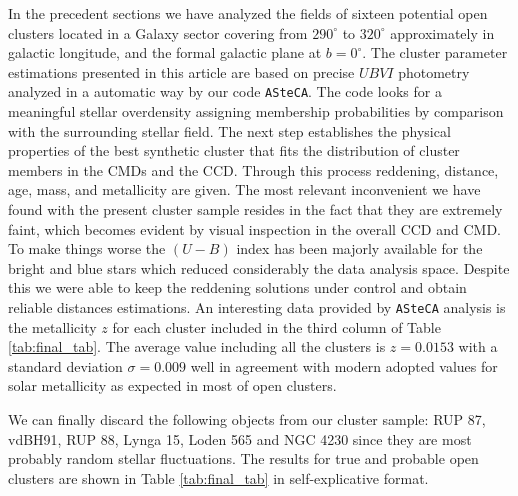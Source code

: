 \documentclass[draft]{aa}
\begin{document}
In the precedent sections we have analyzed the fields of sixteen potential
open clusters located in a Galaxy sector covering from $290^\circ$ to
$320^\circ$ approximately in galactic longitude, and the formal
galactic plane at $b=0^\circ$.
The cluster parameter estimations presented in this article are based on
precise $UBVI$ photometry analyzed in a automatic way by
our code \texttt{ASteCA}. The code looks for a meaningful stellar overdensity
assigning membership probabilities by comparison with the surrounding stellar
field.
The next step establishes the physical properties of the best synthetic cluster
that fits the distribution of cluster members in the CMDs and the CCD.
Through this process reddening, distance, age, mass, and metallicity are
given.
The most relevant inconvenient we have found with the present cluster
sample resides in the fact that they are extremely faint, which becomes evident
by visual inspection in the overall CCD and CMD.
To make things worse the $(U-B)$ index has been majorly available for
the bright and blue stars which reduced considerably the data analysis space.
Despite this we were able to keep the reddening solutions under control and
obtain reliable distances estimations.
An interesting data provided by \texttt{ASteCA} analysis is the
metallicity $z$ for each cluster included in the third column of Table 
\ref{tab:final_tab}. The average value including all the clusters is $z=0.0153$
with a standard deviation $\sigma = 0.009$ well in agreement with modern
adopted values for solar metallicity as expected in most of open clusters.

We can finally discard the following objects from our cluster sample: RUP 87,
vdBH91, RUP 88, Lynga 15, Loden 565 and NGC 4230 since they are most probably
random stellar fluctuations. The results for true and probable open clusters are
shown in Table \ref{tab:final_tab} in self-explicative format.\\
\end{document}
